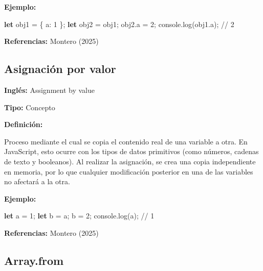 \documentclass[
  letterpaper,
  DIV=11,
  numbers=noendperiod]{scrreprt}
\newenvironment{Shaded}{\begin{snugshade}}{\end{snugshade}}
\newcommand{\AttributeTok}[1]{\textcolor[rgb]{0.40,0.45,0.13}{#1}}
\newcommand{\BuiltInTok}[1]{\textcolor[rgb]{0.00,0.23,0.31}{#1}}
\newcommand{\CommentTok}[1]{\textcolor[rgb]{0.37,0.37,0.37}{#1}}
\newcommand{\DataTypeTok}[1]{\textcolor[rgb]{0.68,0.00,0.00}{#1}}
\newcommand{\DecValTok}[1]{\textcolor[rgb]{0.68,0.00,0.00}{#1}}
\newcommand{\FunctionTok}[1]{\textcolor[rgb]{0.28,0.35,0.67}{#1}}
\newcommand{\KeywordTok}[1]{\textcolor[rgb]{0.00,0.23,0.31}{\textbf{#1}}}
\newcommand{\NormalTok}[1]{\textcolor[rgb]{0.00,0.23,0.31}{#1}}
\newcommand{\OperatorTok}[1]{\textcolor[rgb]{0.37,0.37,0.37}{#1}}
\let\oldsubsection\subsection
\renewcommand{\subsection}{\phantomsection\oldsubsection}
\begin{document}
\textbf{Ejemplo:}

\begin{Shaded}
\begin{Highlighting}[]
\KeywordTok{let}\NormalTok{ obj1 }\OperatorTok{=}\NormalTok{ \{ }\DataTypeTok{a}\OperatorTok{:} \DecValTok{1}\NormalTok{ \}}\OperatorTok{;}
\KeywordTok{let}\NormalTok{ obj2 }\OperatorTok{=}\NormalTok{ obj1}\OperatorTok{;}
\NormalTok{obj2}\OperatorTok{.}\AttributeTok{a} \OperatorTok{=} \DecValTok{2}\OperatorTok{;}
\BuiltInTok{console}\OperatorTok{.}\FunctionTok{log}\NormalTok{(obj1}\OperatorTok{.}\AttributeTok{a}\NormalTok{)}\OperatorTok{;} \CommentTok{// 2}
\end{Highlighting}
\end{Shaded}

\textbf{Referencias:} Montero (2025)

\subsection*{Asignación por valor}\label{glos-asignacion_por_valor}

\textbf{Inglés:} Assignment by value

\textbf{Tipo:} Concepto

\textbf{Definición:}

Proceso mediante el cual se copia el contenido real de una variable a
otra. En JavaScript, esto ocurre con los tipos de datos primitivos (como
números, cadenas de texto y booleanos). Al realizar la asignación, se
crea una copia independiente en memoria, por lo que cualquier
modificación posterior en una de las variables no afectará a la otra.

\textbf{Ejemplo:}

\begin{Shaded}
\begin{Highlighting}[]
\KeywordTok{let}\NormalTok{ a }\OperatorTok{=} \DecValTok{1}\OperatorTok{;}
\KeywordTok{let}\NormalTok{ b }\OperatorTok{=}\NormalTok{ a}\OperatorTok{;}
\NormalTok{b }\OperatorTok{=} \DecValTok{2}\OperatorTok{;}
\BuiltInTok{console}\OperatorTok{.}\FunctionTok{log}\NormalTok{(a)}\OperatorTok{;} \CommentTok{// 1}
\end{Highlighting}
\end{Shaded}

\textbf{Referencias:} Montero (2025)

\subsection*{Array.from}\label{glos-array_from}
\end{document}
